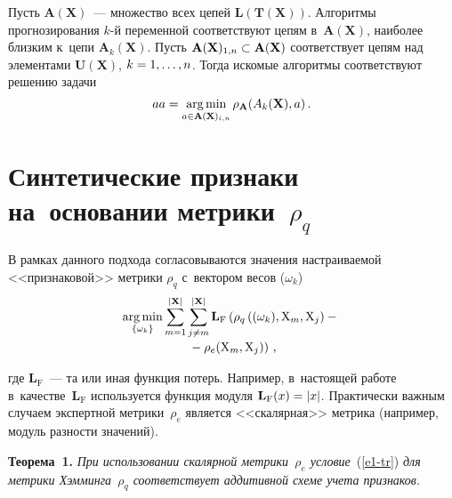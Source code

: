 \begin{multicols}{2}
     Пусть $\mathbf{A}(\mathbf{X})$~--- множество всех цепей 
$\mathbf{L}(\mathbf{T}(\mathbf{X}))$. Алгоритмы прогнозирования $k$-й 
переменной соответствуют цепям в~$\mathbf{A}(\mathbf{X})$, наиболее 
близким к~цепи $\mathbf{A}_k(\mathbf{X})$. Пусть 
$\mathbf{A}(\mathbf{X})_{1,n}\hm\subset \mathbf{A}(\mathbf{X})$  соответствует 
цепям над элементами $\mathbf{U}(\mathbf{X})$, $k\hm=1,\ldots , n$. Тогда 
искомые алгоритмы соответствуют решению задачи
     \begin{equation}
     aa=\mathop{\mathrm{arg}\,\mathrm{min}}\limits_{a\in \mathbf{A}(\mathbf{X})_{i,n}} \rho_{\mathbf{A}} 
(A_k(\mathbf{X}),a)\,.
     \label{e1-tr}
     \end{equation}
     
     \vspace*{-12pt}

\section{Синтетические признаки на~основании метрики~$\rho_q$}

\vspace*{-2pt}

     В рамках данного подхода согласовываются значения настраиваемой 
<<признаковой>> метрики $\rho_q$ с~вектором весов ($\omega_k$) 
     \begin{multline}
     \mathop{\mathrm{arg}\,\mathrm{min}}\limits_{\{\omega_k\}} \sum\limits_{m=1}^{\vert\mathbf{X}\vert} 
\sum\limits^{\vert\mathbf{X}\vert}_{j\not= m} \mathbf{L}_{\mathrm{F}} \left(\rho_q \left( 
(\omega_k), \mathrm{X}_m, \mathrm{X}_j\right) -{}\right.\\[-2pt]
\left.{}- \rho_e (\mathrm{X}_m, 
\mathrm{X}_j)\right)\,,
     \label{e2-tr}
     \end{multline}
     
   
     
     
     \noindent
где $\mathbf{L}_{\mathrm{F}}$~--- та или иная функция потерь. Например, в~настоящей 
работе в~качестве~$\mathbf{L}_{\mathrm{F}}$ используется функция модуля 
$\mathbf{L}_{\mathrm{F}}(x)\hm= \vert x\vert$. Практически важным случаем экспертной 
метрики~$\rho_e$ является <<скалярная>> метрика (например, модуль 
разности значений).

\vspace*{2pt}

\noindent
\textbf{Теорема~1.} \textit{При использовании скалярной метрики~$\rho_e$ 
условие}~(\ref{e1-tr}) \textit{для метрики Хэмминга~$\rho_q$ соответствует 
аддитивной схеме учета признаков}. 


\end{multicols}
